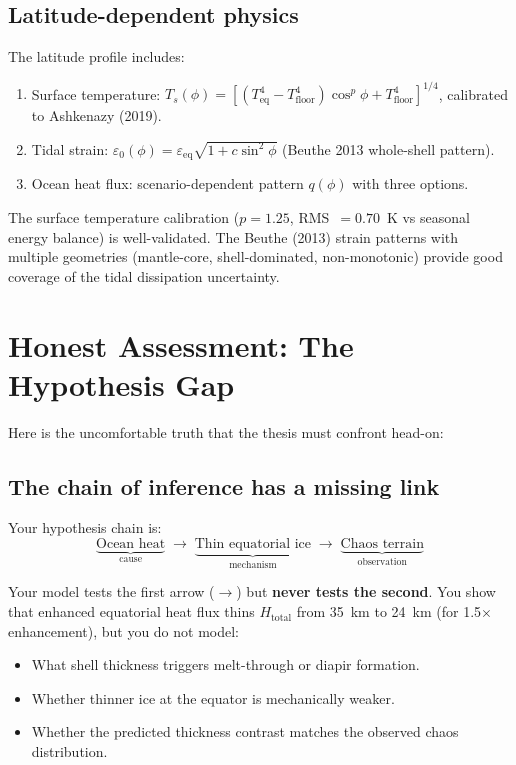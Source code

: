 \documentclass[11pt,a4paper]{article}
\begin{document}
\subsection{Latitude-dependent physics}

The latitude profile includes:
\begin{enumerate}[leftmargin=2em]
\item Surface temperature: $T_s(\phi) = [(T_\mathrm{eq}^4 - T_\mathrm{floor}^4)
      \cos^p\phi + T_\mathrm{floor}^4]^{1/4}$, calibrated to Ashkenazy (2019).
\item Tidal strain: $\varepsilon_0(\phi) = \varepsilon_\mathrm{eq}
      \sqrt{1 + c\sin^2\phi}$ (Beuthe 2013 whole-shell pattern).
\item Ocean heat flux: scenario-dependent pattern $q(\phi)$ with three options.
\end{enumerate}

\begin{strength}
The surface temperature calibration ($p = 1.25$, RMS~$= 0.70$~K vs
seasonal energy balance) is well-validated. The Beuthe (2013) strain
patterns with multiple geometries (mantle-core, shell-dominated,
non-monotonic) provide good coverage of the tidal dissipation uncertainty.
\end{strength}

\section{Honest Assessment: The Hypothesis Gap}

Here is the uncomfortable truth that the thesis must confront head-on:

\subsection{The chain of inference has a missing link}

Your hypothesis chain is:
\[
\underbrace{\text{Ocean heat}}_{\text{cause}}
\;\longrightarrow\;
\underbrace{\text{Thin equatorial ice}}_{\text{mechanism}}
\;\longrightarrow\;
\underbrace{\text{Chaos terrain}}_{\text{observation}}
\]

Your model tests the first arrow ($\longrightarrow$) but \textbf{never
tests the second}. You show that enhanced equatorial heat flux thins
$H_\mathrm{total}$ from 35~km to 24~km (for 1.5$\times$ enhancement), but
you do not model:
\begin{itemize}[leftmargin=2em]
\item What shell thickness triggers melt-through or diapir formation.
\item Whether thinner ice at the equator is mechanically weaker.
\item Whether the predicted thickness contrast matches the observed chaos
      distribution.
\end{itemize}
\end{document}
